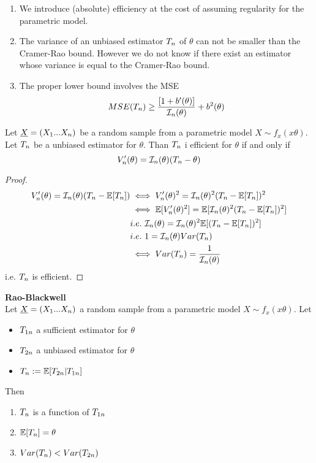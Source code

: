 \begin{oss}
	\begin{enumerate}
		\item We introduce (absolute) efficiency at the cost of assuming regularity for the parametric model.
		\item The variance of an unbiased estimator $T_{n}$ of $\theta$ can not be smaller than the Cramer-Rao bound. However we do not know if there exist an estimator whose variance is equal to the Cramer-Rao bound.
		\item The proper lower bound involves the MSE
		$$MSE(T_{n})\geq\frac{[1+b'(\theta)]}{\mathcal{I}_n(\theta)}+b^2(\theta)$$ 
\end{enumerate}
\end{oss}
\begin{prop}
	Let $\underline X=(X_1...X_n)$ be a random sample from a parametric model  $X\sim f_x(x\theta)$. Let $T_{n}$ be a unbiased estimator for $\theta$. Than $T_{n}$ i efficient for $\theta$ if and only if
	$$V_n'(\theta)=\mathcal{I}_n(\theta) (T_n-\theta)$$
\end{prop}
\begin{proof}
	\[
	\begin{split}
	V_n'(\theta)=\mathcal{I}_n(\theta) (T_{n}-\mathbb{E}[T_{n}])&
	\iff 	V_n'(\theta)^2=\mathcal{I}_n(\theta)^2 (T_{n}-\mathbb{E}[T_{n}])^2\\
	&\iff 	\mathbb{E}[V_n'(\theta)^2]=\mathbb{E}[\mathcal{I}_n(\theta)^2 (T_{n}-\mathbb{E}[T_{n}])^2]\\
	&i.e. \ \mathcal{I}_n(\theta)=\mathcal{I}_n(\theta)^2 \mathbb{E}[(T_{n}-\mathbb{E}[T_{n}])^2]\\
	&i.e. \ 1=\mathcal{I}_n(\theta) Var(T_{n})\\
	&\iff Var(T_{n})=\frac{1}{\mathcal{I}_n(\theta)}
	\end{split}
	\]
	i.e. $T_{n}$ is efficient.
\end{proof}
\begin{teo}
	\textbf{Rao-Blackwell}\\
	Let $\underline X=(X_1 ... X_n)$ a random sample from a parametric model  $X\sim f_x(x\theta)$. Let
	\begin{itemize}
		\item $T_{1n}$ a sufficient estimator for $\theta$
		\item $T_{2n}$ a unbiased estimator for $\theta$
		\item $T_{n}:=\mathbb{E}[T_{2n}|T_{1n}]$
	\end{itemize}
Then
\begin{enumerate}
	\item $T_{n}$ is a function of $T_{1n}$
	\item $\mathbb{E}[T_{n}]=\theta$
	\item $Var(T_{n})<Var(T_{2n})$
\end{enumerate}
\end{teo}

